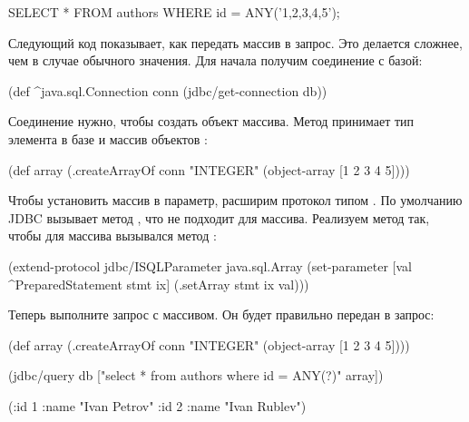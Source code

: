 \begin{english}
  \begin{clojure}
SELECT * FROM authors WHERE id = ANY('{1,2,3,4,5}');
  \end{clojure}
\end{english}

Следующий код показывает, как передать массив в запрос. Это делается сложнее, чем в случае обычного значения. Для начала получим соединение с базой:

\begin{english}
  \begin{clojure}
(def ^java.sql.Connection conn
  (jdbc/get-connection db))
  \end{clojure}
\end{english}

Соединение нужно, чтобы создать объект массива. Метод  принимает тип элемента в базе и массив объектов :

\begin{english}
  \begin{clojure}
(def array
  (.createArrayOf conn "INTEGER"
                  (object-array [1 2 3 4 5])))
  \end{clojure}
\end{english}

Чтобы установить массив в параметр, расширим протокол  типом . По умолчанию JDBC вызывает метод , что не подходит для массива. Реализуем метод  так, чтобы для массива вызывался метод :

\begin{english}
  \begin{clojure}
(extend-protocol jdbc/ISQLParameter
  java.sql.Array
  (set-parameter [val ^PreparedStatement stmt ix]
    (.setArray stmt ix val)))
  \end{clojure}
\end{english}

Теперь выполните запрос с массивом. Он будет правильно передан в запрос:

\begin{english}
  \begin{clojure}
(def array
  (.createArrayOf conn "INTEGER"
                  (object-array [1 2 3 4 5])))

(jdbc/query db ["select * from authors
                 where id = ANY(?)" array])

({:id 1 :name "Ivan Petrov"}
 {:id 2 :name "Ivan Rublev"})
  \end{clojure}
\end{english}

